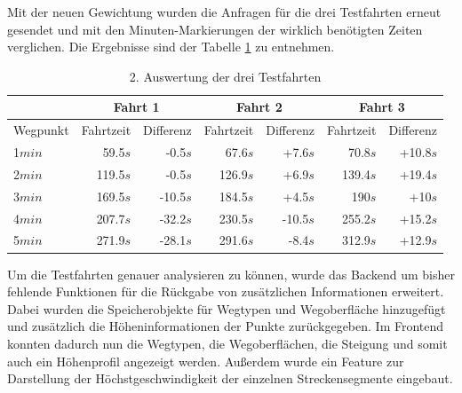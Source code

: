 Mit der neuen Gewichtung wurden die Anfragen für die drei Testfahrten erneut gesendet und mit den Minuten-Markierungen der wirklich benötigten Zeiten verglichen.
Die Ergebnisse sind der Tabelle \ref{tab:all} zu entnehmen.

\begin{table}[htb]
\centering
\caption{2. Auswertung der drei Testfahrten}
\label{tab:all}
\begin{tabular}{|l|r|r|r|r|r|r|}
\hhline{~|-|-|-|-|-|-}
\multicolumn{1}{l|}{} & \multicolumn{2}{c|}{Fahrt 1} & \multicolumn{2}{c|}{Fahrt 2} & \multicolumn{2}{c|}{Fahrt 3} \\ \hline
Wegpunkt              & Fahrtzeit   & Differenz     & Fahrtzeit   & Differenz     & Fahrtzeit  & Differenz      \\ \hline 
1$min$                & 59.5$s$     & -0.5$s$        & 67.6$s$     & +7.6$s$        & 70.8$s$    & +10.8$s$        \\
2$min$                & 119.5$s$    & -0.5$s$        & 126.9$s$    & +6.9$s$        & 139.4$s$   & +19.4$s$        \\
3$min$                & 169.5$s$    & -10.5$s$       & 184.5$s$    & +4.5$s$        & 190$s$     & +10$s$          \\
4$min$                & 207.7$s$    & -32.2$s$       & 230.5$s$    & -10.5$s$       & 255.2$s$   & +15.2$s$        \\
5$min$                & 271.9$s$    & -28.1$s$       & 291.6$s$    & -8.4$s$        & 312.9$s$   & +12.9$s$        \\
\hline
\end{tabular}
\end{table}


Um die Testfahrten genauer analysieren zu können, wurde das Backend um bisher fehlende Funktionen für die Rückgabe von zusätzlichen Informationen erweitert.
Dabei wurden die Speicherobjekte für Wegtypen und Wegoberfläche hinzugefügt und zusätzlich die Höheninformationen der Punkte zurückgegeben.
Im Frontend konnten dadurch nun die Wegtypen, die Wegoberflächen, die Steigung und somit auch ein Höhenprofil angezeigt werden.
Außerdem wurde ein Feature zur Darstellung der Höchstgeschwindigkeit der einzelnen Streckensegmente eingebaut.